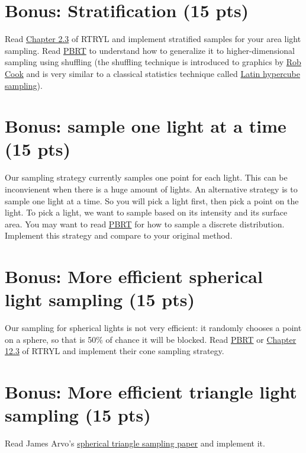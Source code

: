 \section{Bonus: Stratification (15 pts)}
Read \href{https://raytracing.github.io/books/RayTracingTheRestOfYourLife.html#asimplemontecarloprogram/stratifiedsamples(jittering)}{Chapter 2.3} of RTRYL and implement stratified samples for your area light sampling. Read \href{https://www.pbr-book.org/3ed-2018/Sampling_and_Reconstruction/Stratified_Sampling}{PBRT} to understand how to generalize it to higher-dimensional sampling using shuffling (the shuffling technique is introduced to graphics by \href{https://graphics.pixar.com/library/StochasticSampling/paper.pdf}{Rob Cook} and is very similar to a classical statistics technique called \href{https://en.wikipedia.org/wiki/Latin_hypercube_sampling}{Latin hypercube sampling}).

\section{Bonus: sample one light at a time (15 pts)}
Our sampling strategy currently samples one point for each light. This can be inconvienent when there is a huge amount of lights. An alternative strategy is to sample one light at a time. So you will pick a light first, then pick a point on the light. To pick a light, we want to sample based on its intensity and its surface area. You may want to read \href{https://www.pbr-book.org/3ed-2018/Monte_Carlo_Integration/Sampling_Random_Variables#x1-Example:Piecewise-Constant1DFunctions}{PBRT} for how to sample a discrete distribution. Implement this strategy and compare to your original method.

\section{Bonus: More efficient spherical light sampling (15 pts)}
Our sampling for spherical lights is not very efficient: it randomly chooses a point on a sphere, so that is 50\% of chance it will be blocked. Read \href{https://www.pbr-book.org/3ed-2018/Light_Transport_I_Surface_Reflection/Sampling_Light_Sources#x2-SamplingSpheres}{PBRT} or \href{https://raytracing.github.io/books/RayTracingTheRestOfYourLife.html#cleaninguppdfmanagement/samplingasphereobject}{Chapter 12.3} of RTRYL and implement their cone sampling strategy.

\section{Bonus: More efficient triangle light sampling (15 pts)}
Read James Arvo's \href{https://dl.acm.org/doi/pdf/10.1145/218380.218500}{spherical triangle sampling paper} and implement it.

%
%


